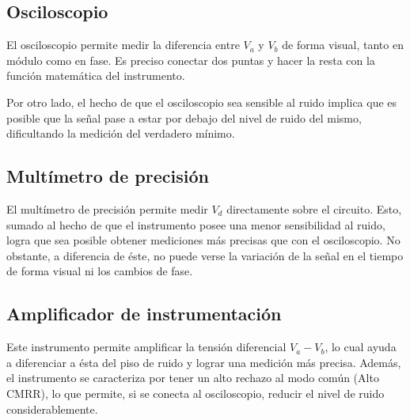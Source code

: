 \subsection{Osciloscopio}
El osciloscopio permite medir la diferencia entre $V_a$ y $V_b$ de forma visual, tanto en módulo como en fase. Es preciso conectar dos puntas y hacer la resta con la función matemática del instrumento. 

Por otro lado, el hecho de que el osciloscopio sea sensible al ruido implica que es posible que la señal pase a estar por debajo del nivel de ruido del mismo, dificultando la medición del verdadero mínimo.
\subsection{Multímetro de precisión}
El multímetro de precisión permite medir $V_d$ directamente sobre el circuito. Esto, sumado al hecho de que el instrumento posee una menor sensibilidad al ruido, logra que sea posible obtener mediciones más precisas que con el osciloscopio. No obstante, a diferencia de éste, no puede verse la variación de la señal en el tiempo de forma visual ni los cambios de fase.

\subsection{Amplificador de instrumentación}
Este instrumento permite amplificar la tensión diferencial $V_a-V_b$, lo cual ayuda a diferenciar a ésta del piso de ruido y lograr una medición más precisa. Además, el instrumento se caracteriza por tener un alto rechazo al modo común (Alto CMRR), lo que permite, si se conecta al osciloscopio, reducir el nivel de ruido considerablemente.

